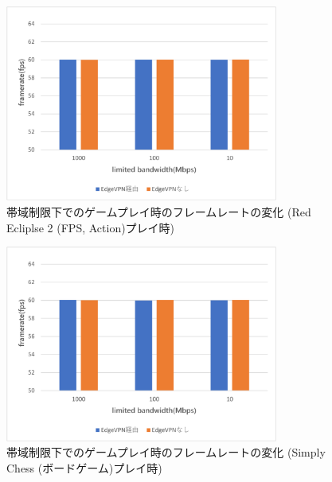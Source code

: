 \begin{figure}[t]
    \centering
    \includegraphics[width=0.8\textwidth,keepaspectratio,clip]{img/framerate_FPS.pdf}
    \caption{帯域制限下でのゲームプレイ時のフレームレートの変化 (Red Ecliplse 2 (FPS, Action)プレイ時)}
    \label{fig:fps_fps}
\end{figure}

\begin{figure}[t]
    \centering
    \includegraphics[width=0.8\textwidth,keepaspectratio,clip]{img/framerate_Board.pdf}
    \caption{帯域制限下でのゲームプレイ時のフレームレートの変化 (Simply Chess (ボードゲーム)プレイ時)}
    \label{fig:fps_board}
\end{figure}